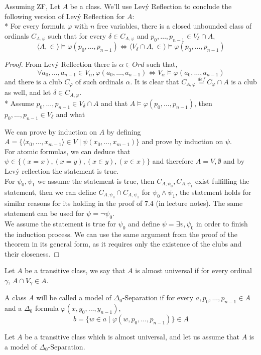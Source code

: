 \question{}
Assuming ZF, Let $A$ be a class. We'll use Lev\'y Reflection to conclude the following version of Lev\'y Reflection for $A$: \\*
For every formula $\varphi$ with $n$ free variables, there is a closed unbounded class of ordinals $C_{A, \varphi}$ such that for every $\delta \in C_{A, \varphi}$ and $p_0, \dots, p_{n - 1} \in V_\delta \cap A$,
\[
	\langle A, \in \rangle \models \varphi(p_0, \dots, p_{n - 1})
	\iff \langle V_\delta \cap A, \in \rangle \models \varphi(p_0, \dots, p_{n - 1})
\]
\begin{proof}
	From Lev\'y Reflection there is $\alpha \in Ord$ such that,
	\[
		\forall a_0, \dots, a_{n - 1} \in V_\alpha, \varphi(a_0, \dots, a_{n - 1}) \iff V_\alpha \models \varphi(a_0, \dots, a_{n - 1})
	\]
	and there is a club $C_\varphi$ of such ordinals $\alpha$. It is clear that $C_{A, \varphi} \overset{def}{=} C_\varphi \cap A$ is a club as well, and let $\delta \in C_{A, \varphi}$. \\*
	Assume $p_0, \dots, p_{n - 1} \in V_\delta \cap A$ and that $A \models \varphi(p_0, \dots, p_{n - 1})$, then $p_0, \dots, p_{n - 1} \in V_\delta$ and what


	We can prove by induction on $A$ by defining $A = \{ \langle x_0, \dots, x_{m - 1} \rangle \in V \mid \psi(x_0, \dots, x_{m - 1}) \}$ and prove by induction on $\psi$. \\
	For atomic formulas, we can deduce that $\psi \in \{ (x = x), (x = y), (x \in y), (x \in x) \}$ and therefore $A = V, \emptyset$ and by Lev\'y reflection the statement is true. \\
	For $\psi_0, \psi_1$ we assume the statement is true, then $C_{A, \psi_0}, C_{A, \psi_1}$ exist fulfilling the statement,
	then we can define $C_{A, \psi_0} \cap C_{A, \psi_1}$ for $\psi_0 \land \psi_1$, the statement holds for similar reasons for its holding in the proof of 7.4 (in lecture notes).
	The same statement can be used for $\psi = \lnot \psi_0$. \\
	We assume the statement is true for $\psi_0$ and define $\psi = \exists v, \psi_0$ in order to finish the induction process.
	We can use the same argument from the proof of the theorem in its general form, as it requires only the existence of the clubs and their closeness.
\end{proof}

\question{}
\begin{definition*}
	Let $A$ be a transitive class, we say that $A$ is almost universal if for every ordinal $\gamma$, $A \cap V_\gamma \in A$.
\end{definition*}
\begin{definition*}
	A class $A$ will be called a model of $\Delta_0$-Separation if for every $a, p_0, \dots, p_{n - 1} \in A$ and a $\Delta_0$ formula $\varphi(x, y_0, \dots, y_{n - 1})$,
	\[
		b = \{ w \in a \mid \varphi(w, p_0, \dots, p_{n - 1})\} \in A
	\]
\end{definition*}
Let $A$ be a transitive class which is almost universal, and let us assume that $A$ is a model of $\Delta_0$-Separation.

